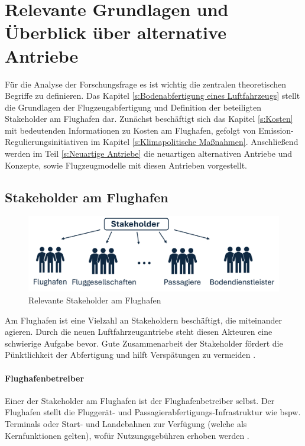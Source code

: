 \chapter{Relevante Grundlagen und Überblick über alternative Antriebe}
\label{ch:Relevante Grundlagen und Überblick über alternative Antriebe}
Für die Analyse der Forschungsfrage es ist wichtig die zentralen theoretischen Begriffe zu definieren. 
Das Kapitel \ref{s:Bodenabfertigung eines Luftfahrzeugs} stellt die Grundlagen der Flugzeugabfertigung und Definition
der beteiligten Stakeholder am Flughafen dar. Zunächst beschäftigt sich das Kapitel \ref{s:Kosten}
mit bedeutenden Informationen zu Kosten am Flughafen, gefolgt von Emission-Regulierungsinitiativen im Kapitel \ref{s:Klimapolitische Maßnahmen}. 
Anschließend werden im Teil \ref{s:Neuartige Antriebe}
die neuartigen alternativen Antriebe und Konzepte, sowie Flugzeugmodelle mit diesen Antrieben vorgestellt.

\section{Stakeholder am Flughafen}
\label{s:Stakeholder am Flughafen}
%
\begin{figure}[h]
	\centering
	\includegraphics[width=0.8\linewidth]{Bilder/Stakeholder.png}
	\caption[Relevante Stakeholder am Flughafen]{Relevante Stakeholder am Flughafen}
	\label{stakeholder}
\end{figure}

Am Flughafen ist eine Vielzahl an Stakeholdern beschäftigt, die miteinander agieren. 
Durch die neuen Luftfahrzeugantriebe steht diesen Akteuren eine schwierige Aufgabe bevor. 
Gute Zusammenarbeit der Stakeholder fördert die Pünktlichkeit der Abfertigung und 
hilft Verspätungen zu vermeiden \cite{schmidt2016challenges}.

\subsubsection{Flughafenbetreiber}
Einer der Stakeholder am Flughafen ist der Flughafenbetreiber selbst. 
Der Flughafen stellt die Fluggerät- und Passagierabfertigungs-Infrastruktur wie bspw. 
Terminals oder Start- und Landebahnen zur Verfügung (welche als Kernfunktionen gelten), 
wofür Nutzungsgebühren erhoben werden \cite{conrady2019luftverkehr}. %

